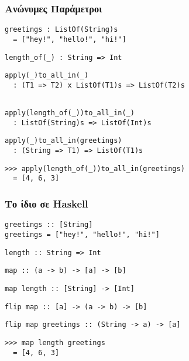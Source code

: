 \documentclass{beamer}
\def\e{\foreignlanguage{english}}
\def\h{\e{Haskell}}
\begin{document}
\begin{frame}[fragile]

\frametitle{Ανώνυμες Παράμετροι}

\begin{otherlanguage}{english}

\begin{verbatim}
greetings : ListOf(String)s
  = ["hey!", "hello!", "hi!"]
\end{verbatim}
\begin{verbatim}
length_of(_) : String => Int
\end{verbatim}
\begin{verbatim}
apply(_)to_all_in(_)
  : (T1 => T2) x ListOf(T1)s => ListOf(T2)s


\end{verbatim}
\begin{verbatim}
apply(length_of(_))to_all_in(_)
  : ListOf(String)s => ListOf(Int)s
\end{verbatim}
\begin{verbatim}
apply(_)to_all_in(greetings)
  : (String => T1) => ListOf(T1)s
\end{verbatim}
\begin{verbatim}
>>> apply(length_of(_))to_all_in(greetings)
  = [4, 6, 3]
\end{verbatim}

\end{otherlanguage}

\end{frame}

\begin{frame}[fragile]

\frametitle{Το ίδιο σε \h}

\begin{otherlanguage}{english}

\begin{verbatim}
greetings :: [String]
greetings = ["hey!", "hello!", "hi!"]
\end{verbatim}
\begin{verbatim}
length :: String => Int
\end{verbatim}
\begin{verbatim}
map :: (a -> b) -> [a] -> [b]

\end{verbatim}
\begin{verbatim}
map length :: [String] -> [Int]
\end{verbatim}
\begin{verbatim}
flip map :: [a] -> (a -> b) -> [b]
\end{verbatim}
\begin{verbatim}
flip map greetings :: (String -> a) -> [a]
\end{verbatim}
\begin{verbatim}
>>> map length greetings
  = [4, 6, 3]
\end{verbatim}

\end{otherlanguage}

\end{frame}
\end{document}
